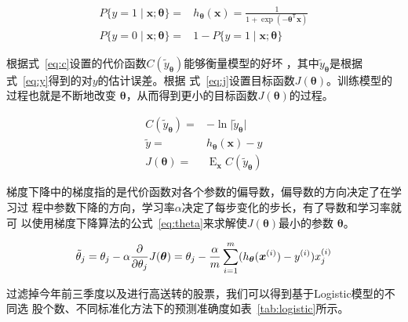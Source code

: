 \documentclass[../main]{subfiles}
\begin{document}
\begin{align}
  \label{eq:logistic}
  P\{y = 1\mid \bm{x};\bm{\theta}\} = & h_{\bm{\theta}}(\bm{x}) =
  \frac{1}{1 + \exp{(-\bm{\theta}^\mathsf{T}\bm{x})}}\\
  P\{y = 0\mid \bm{x};\bm{\theta}\} = & 1 - P\{y = 1\mid \bm{x};\bm{\theta}\}
\end{align}

根据式~\ref{eq:c}设置的代价函数$C(\tilde{y}_{\bm{\theta}})$能够衡量模型的好坏
，其中$\tilde{y}_{\bm{\theta}}$是根据式~\ref{eq:y}得到的对$y$的估计误差。根据
式~\ref{eq:j}设置目标函数$J(\bm{\theta})$。训练模型的过程也就是不断地改变
$\bm{\theta}$，从而得到更小的目标函数$J(\bm{\theta})$的过程。

\begin{align}
  \label{eq:c}
  C(\tilde{y}_{\bm{\theta}}) = & -\ln\lvert \tilde{y}_{\bm{\theta}}\rvert\\
  \label{eq:y}
  \tilde{y} = & h_{\bm{\theta}}(\bm{x}) - y\\
  \label{eq:j}
  J(\bm{\theta}) = & \mathop{\mathrm{E}}_{\bm{x}}C(\tilde{y}_{\bm{\theta}})
\end{align}

梯度下降中的梯度指的是代价函数对各个参数的偏导数，偏导数的方向决定了在学习过
程中参数下降的方向，学习率$\alpha$决定了每步变化的步长，有了导数和学习率就可
以使用梯度下降算法的公式~\ref{eq:theta}来求解使$J(\bm{\theta})$最小的参数
$\bm{\theta}$。

\begin{align}
  \label{eq:theta}
  \tilde{\theta}_j = \theta_j -
  \alpha\pdv{\theta_j}J(\bm{\theta}) = \theta_j -
  \frac{\alpha}{m}\sum^{m}_{i = 1}(h_{\bm{\theta}}(\bm{x}^{(i)}) -
  y^{(i)})x_j^{(i)}
\end{align}

过滤掉今年前三季度以及进行高送转的股票，我们可以得到基于Logistic模型的不同选
股个数、不同标准化方法下的预测准确度如表~\ref{tab:logistic}所示。
\end{document}
